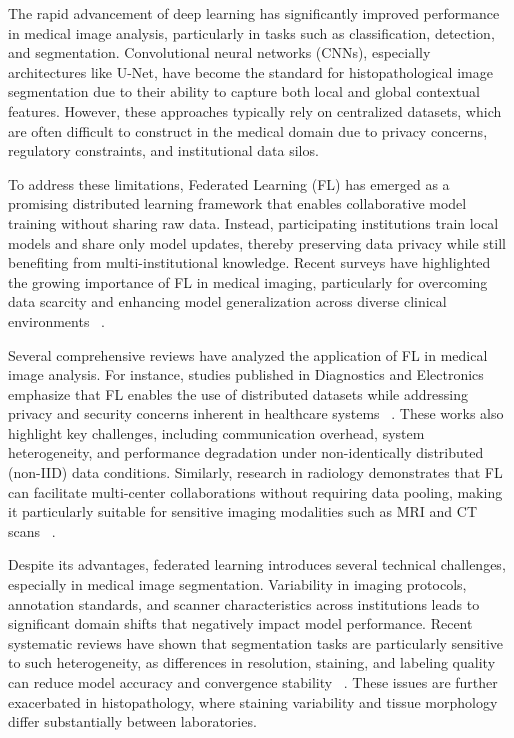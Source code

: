 \documentclass[conference]{IEEEtran}
\begin{document}
The rapid advancement of deep learning has significantly improved performance in medical image analysis, particularly in tasks such as classification, detection, and segmentation. Convolutional neural networks (CNNs), especially architectures like U-Net, have become the standard for histopathological image segmentation due to their ability to capture both local and global contextual features. However, these approaches typically rely on centralized datasets, which are often difficult to construct in the medical domain due to privacy concerns, regulatory constraints, and institutional data silos.

To address these limitations, Federated Learning (FL) has emerged as a promising distributed learning framework that enables collaborative model training without sharing raw data. Instead, participating institutions train local models and share only model updates, thereby preserving data privacy while still benefiting from multi-institutional knowledge. Recent surveys have highlighted the growing importance of FL in medical imaging, particularly for overcoming data scarcity and enhancing model generalization across diverse clinical environments ~\cite{LL1}.

Several comprehensive reviews have analyzed the application of FL in medical image analysis. For instance, studies published in Diagnostics and Electronics emphasize that FL enables the use of distributed datasets while addressing privacy and security concerns inherent in healthcare systems ~\cite{LL2}. These works also highlight key challenges, including communication overhead, system heterogeneity, and performance degradation under non-identically distributed (non-IID) data conditions. Similarly, research in radiology demonstrates that FL can facilitate multi-center collaborations without requiring data pooling, making it particularly suitable for sensitive imaging modalities such as MRI and CT scans ~\cite{LL3}.

Despite its advantages, federated learning introduces several technical challenges, especially in medical image segmentation. Variability in imaging protocols, annotation standards, and scanner characteristics across institutions leads to significant domain shifts that negatively impact model performance. Recent systematic reviews have shown that segmentation tasks are particularly sensitive to such heterogeneity, as differences in resolution, staining, and labeling quality can reduce model accuracy and convergence stability ~\cite{LL4}. These issues are further exacerbated in histopathology, where staining variability and tissue morphology differ substantially between laboratories.
\end{document}
